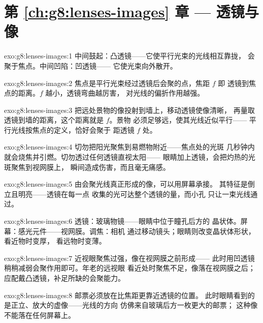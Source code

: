 \section*{第 \ref{ch:g8:lenses-images} 章 --- 透镜与像}

\begin{solution}{exo:g8:lenses-images:1}
中间鼓起：凸透镜——它使平行光束的光线相互靠拢，
会聚于焦点。中间凹陷：凹透镜——
它使光束向外散开。
\end{solution}

\begin{solution}{exo:g8:lenses-images:2}
焦点是平行光束经过透镜后会聚的点，焦距 $f$ 即
透镜到焦点的距离。$f$ 越小，透镜弯曲越厉害，
对光线的偏折作用越强。
\end{solution}

\begin{solution}{exo:g8:lenses-images:3}
把远处景物的像投射到墙上，移动透镜使像清晰，
再量取透镜到墙的距离，这个距离就是 $f$。景物
必须足够远，使其光线近似平行——
平行光线按焦点的定义，恰好会聚于
距透镜 $f$ 处。
\end{solution}

\begin{solution}{exo:g8:lenses-images:4}
切勿把阳光聚焦到易燃物附近——焦点处的光斑
几秒钟内就会烧焦并引燃。切勿透过任何透镜直视太阳——
眼睛加上透镜，会把灼热的光斑聚焦到视网膜上，
瞬间造成伤害，而且毫无痛感。
\end{solution}

\begin{solution}{exo:g8:lenses-images:5}
由会聚光线真正形成的像，可以用屏幕承接。
其特征是倒立且明亮——透镜在每一点
收集的光可达整个透镜的量，而小孔
只让一束光线通过。
\end{solution}

\begin{solution}{exo:g8:lenses-images:6}
透镜：玻璃物镜——眼睛中位于瞳孔后方的
晶状体。屏幕：感光元件——视网膜。调焦：相机
通过移动镜头；眼睛则改变晶状体形状，看近物时变厚，
看远物时变薄。
\end{solution}

\begin{solution}{exo:g8:lenses-images:7}
近视眼聚焦过强，像在视网膜之前形成——
此时用凹透镜稍稍减弱会聚作用即可。年老的远视眼
看近处时聚焦不足，像落在视网膜之后；
应配戴凸透镜，补足所缺的会聚能力。
\end{solution}

\begin{solution}{exo:g8:lenses-images:8}
邮票必须放在比焦距更靠近透镜的位置。
此时眼睛看到的是正立、放大的虚像——光线的方向
仿佛来自玻璃后方一枚更大的邮票；
这种像不能落在任何屏幕上。
\end{solution}

